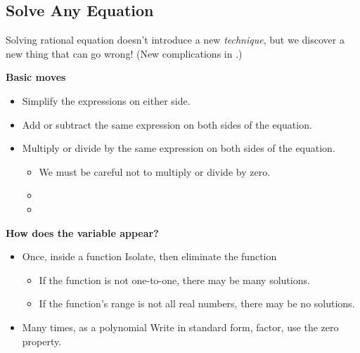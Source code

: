\subsection{Solve Any Equation} 
Solving rational equation doesn't introduce a new \emph{technique}, but we discover a new thing that can go wrong! (New complications in .)
\begin{fact}
\textbf{Basic moves}
\begin{itemize}
\item Simplify the expressions on either side.
\item Add or subtract the same expression on both sides of the equation.
\item Multiply or divide by the same expression on both sides of the equation.
\begin{itemize}
\item We must be careful not to multiply or divide by zero.
\item{}
\item{}
\end{itemize}
\end{itemize}
\textbf{How does the variable appear?}
\begin{itemize}
\item Once, inside a function {\textrightarrow} Isolate, then eliminate the function
\begin{itemize}
\item If the function is not one-to-one, there may be many solutions.
\item If the function's range is not all real numbers, there may be no solutions.
\end{itemize}
\item Many times, as a polynomial {\textrightarrow} Write in standard form, factor, use the zero property.
\end{itemize}
\end{fact}